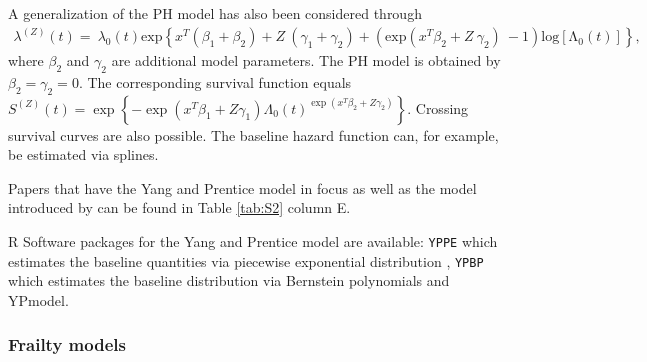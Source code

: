 \noindent 

\noindent 
A generalization of the PH model has also been considered through 
\begin{align*}
{\lambda }^{\left(Z\right)}\left(t\right)=\ {\lambda }_0\left(t\right){\mathrm{exp} \left \{ x^T\left(\beta_1 +\beta_2 \right)+Z\ \left(\gamma_1 +\gamma_2 \right)+\left({\mathrm{exp} (x^T\beta_2 +Z\ \gamma_2 )\ }-1\right){\mathrm{log} [{\mathrm{\Lambda }}_0(t)]}\right \} },
\end{align*}
where $\beta_2 $ and $\gamma_2 $ are additional model parameters. The PH model is obtained by $\beta_2 =\gamma_2 =0$. The corresponding survival function equals $S^{(Z)}(t) = \exp\left\{ -\exp(x^T \beta_1 + Z \gamma_1) \Lambda_0(t)^{\exp(x^T \beta_2 + Z \gamma_2)} \right\}$. Crossing survival curves are also possible. The baseline hazard function can, for example, be estimated via splines. \cite{Devarajan.2013}

\noindent 
Papers that have the Yang and Prentice model in focus as well as the model introduced by \cite{Devarajan.2013} can be found in Table \ref{tab:S2} column E. 

\noindent 


\noindent R Software packages for the Yang and Prentice model are available: \texttt{YPPE} which estimates the baseline quantities via piecewise exponential distribution \cite{Demarqui.2020b}, \texttt{YPBP} which estimates the baseline distribution via Bernstein polynomials \cite{Demarqui.2020} and YPmodel.

\noindent 


\subsubsection{Frailty models}\label{frailty}

\noindent 


